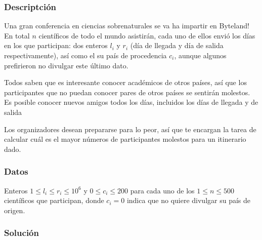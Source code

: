 %
%
%
%

\subsubsection{Descriptci\'on}

Una gran conferencia en ciencias sobrenaturales se va ha impartir en Byteland! En total \(n\) científicos de todo el mundo asistirán, cada uno de ellos envió los días en los que participan: dos enteros \(l_i\) y \(r_i\) (día de llegada y día de salida respectivamente), así como el su país de procedencia \(c_i\), aunque algunos prefirieron no divulgar este último dato.

Todos saben que es interesante conocer académicos de otros países, así que los participantes que no puedan conocer pares de otros países se sentirán molestos. Es posible conocer nuevos amigos todos los días, incluidos los días de llegada y de salida

Los organizadores desean prepararse para lo peor, así que te encargan la tarea de calcular cuál es el mayor números de participantes molestos para un itinerario dado.

\subsubsection{Datos}

Enteros \(1\leq l_i\leq r_i\leq 10^6\) y \(0\leq c_i\leq 200\) para cada uno de los \(1\leq n\leq 500\) científicos que participan, donde \(c_i=0\) indica que no quiere divulgar su país de origen.

\subsubsection{Soluci\'on}

